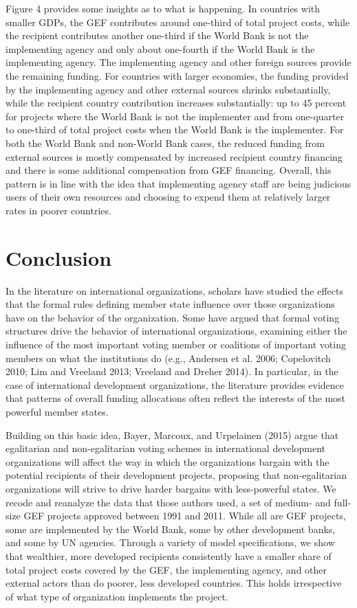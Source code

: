 \documentclass{article}
\begin{document}
Figure 4 provides some insights as to what is happening.  In countries with smaller GDPs, the GEF contributes around one-third of total project costs, while the recipient contributes another one-third if the World Bank is not the implementing agency and only about one-fourth if the World Bank is the implementing agency.  The implementing agency and other foreign sources provide the remaining funding.  For countries with larger economies, the funding provided by the implementing agency and other external sources shrinks substantially, while the recipient country contribution increases substantially: up to 45 percent for projects where the World Bank is not the implementer and from one-quarter to one-third of total project costs when the World Bank is the implementer.  For both the World Bank and non-World Bank cases, the reduced funding from external sources is mostly compensated by increased recipient country financing and there is some additional compensation from GEF financing.  Overall, this pattern is in line with the idea that implementing agency staff are being judicious users of their own resources and choosing to expend them at relatively larger rates in poorer countries. 

\section{Conclusion}
In the literature on international organizations, scholars have studied the effects that the formal rules defining member state influence over those organizations have on the behavior of the organization.  Some have argued that formal voting structures drive the behavior of international organizations, examining either the influence of the most important voting member or coalitions of important voting members on what the institutions do (e.g., Andersen et al. 2006; Copelovitch 2010; Lim and Vreeland 2013; Vreeland and Dreher 2014).  In particular, in the case of international development organizations, the literature provides evidence that patterns of overall funding allocations often reflect the interests of the most powerful member states. 

Building on this basic idea, Bayer, Marcoux, and Urpelainen (2015) argue that egalitarian and non-egalitarian voting schemes in international development organizations will affect the way in which the organizations bargain with the potential recipients of their development projects, proposing that non-egalitarian organizations will strive to drive harder bargains with less-powerful states.  We recode and reanalyze the data that those authors used, a set of medium- and full-size GEF projects approved between 1991 and 2011.  While all are GEF projects, some are implemented by the World Bank, some by other development banks, and some by UN agencies.  Through a variety of model specifications, we show that wealthier, more developed recipients consistently have a smaller share of total project costs covered by the GEF, the implementing agency, and other external actors than do poorer, less developed countries.  This holds irrespective of what type of organization implements the project.  
\end{document}

